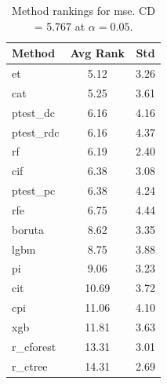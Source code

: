 \begin{table}[h]
\centering
\caption{Method rankings for mse. CD = 5.767 at $\alpha=0.05$.}
\label{tab:ranks_mse}
\begin{tabular}{lcc}
\toprule
Method & Avg Rank & Std \\
\midrule
et & 5.12 & 3.26 \\
cat & 5.25 & 3.61 \\
ptest_dc & 6.16 & 4.16 \\
ptest_rdc & 6.16 & 4.37 \\
rf & 6.19 & 2.40 \\
cif & 6.38 & 3.08 \\
ptest_pc & 6.38 & 4.24 \\
rfe & 6.75 & 4.44 \\
boruta & 8.62 & 3.35 \\
lgbm & 8.75 & 3.88 \\
pi & 9.06 & 3.23 \\
cit & 10.69 & 3.72 \\
cpi & 11.06 & 4.10 \\
xgb & 11.81 & 3.63 \\
r_cforest & 13.31 & 3.01 \\
r_ctree & 14.31 & 2.69 \\
\bottomrule
\end{tabular}
\end{table}